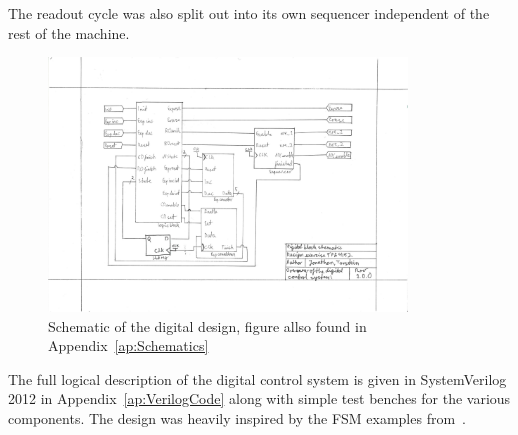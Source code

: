 The readout cycle was also split out into its own sequencer independent of the rest of the machine.

\begin{figure}[p]
  \centering
  \includegraphics[width=0.85\textwidth]{figures/SchematicDigital}
  \caption{Schematic of the digital design, figure allso found in Appendix~\ref{ap:Schematics}}
  \label{fig:digschematic}
\end{figure}

The full logical description of the digital control system is given in SystemVerilog 2012 in Appendix~\ref{ap:VerilogCode} along with simple test benches for the various components.
The design was heavily inspired by the FSM examples from~\cite{DigitalBook}.